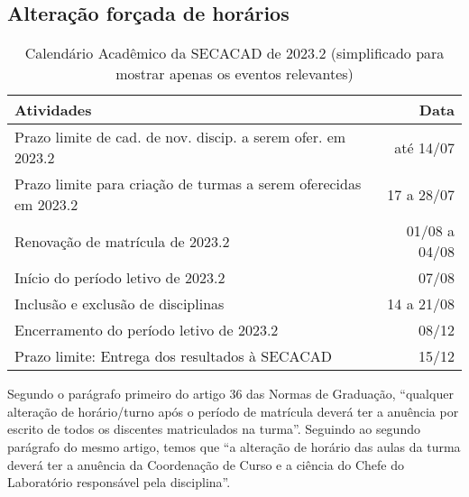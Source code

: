 \subsection{Alteração forçada de horários} %
\begin{table}[H] \centering \caption{Calendário Acadêmico da SECACAD de 2023.2 (simplificado para mostrar apenas os eventos relevantes)} \label{tab:calendario_SECACAD-2023.2}
  \begin{tabular}{| l r |}
    \hline
    \textbf{Atividades}                                              & \textbf{Data} \\
    \hline
    Prazo limite de cad. de nov. discip. a serem ofer. em 2023.2     & até 14/07     \\
    Prazo limite para criação de turmas a serem oferecidas em 2023.2 & 17 a 28/07    \\
    Renovação de matrícula de 2023.2                                 & 01/08 a 04/08 \\
    Início do período letivo de 2023.2                               & 07/08         \\
    Inclusão e exclusão de disciplinas                               & 14 a 21/08    \\
    Encerramento do período letivo de 2023.2                         & 08/12         \\
    Prazo limite: Entrega dos resultados à SECACAD                   & 15/12         \\
    \hline
  \end{tabular}
\end{table}

Segundo o parágrafo primeiro do artigo 36 das Normas de Graduação, ``qualquer alteração de horário/turno após o período de matrícula deverá ter a anuência por escrito de todos os discentes matriculados na turma''. Seguindo ao segundo parágrafo do mesmo artigo, temos que ``a alteração de horário das aulas da turma deverá ter a anuência da Coordenação de Curso e a ciência do Chefe do Laboratório responsável pela disciplina''.

